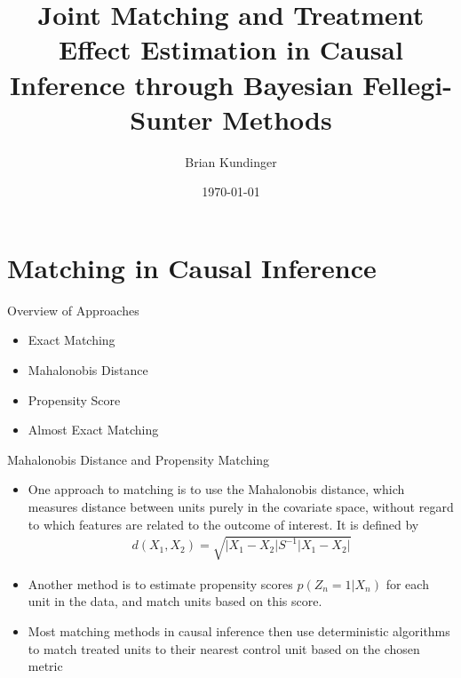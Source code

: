 \documentclass{beamer}
\begin{document}
	\title{Joint Matching and Treatment Effect Estimation in Causal Inference through Bayesian Fellegi-Sunter Methods}
	\author{Brian Kundinger}
	\date{\today}
	

	
	\begin{frame}
		\titlepage
	\end{frame}

\section{Matching in Causal Inference}
\begin{frame}{Overview of Approaches}
	\begin{itemize}
		\item Exact Matching
		\item Mahalonobis Distance
		\item Propensity Score
		\item Almost Exact Matching
	\end{itemize}
\end{frame}

\begin{frame}{Mahalonobis Distance and Propensity Matching}
	\begin{itemize}
	\item One approach to matching is to use the Mahalonobis distance, which measures distance between units purely in the covariate space, without regard to which features are related to the outcome of interest. It is defined by
		\begin{align}
			d(X_1, X_2) = \sqrt{|X_1 - X_2| S^{-1} |X_1 - X_2|}
		\end{align}
	\item Another method is to estimate propensity scores $p(Z_n = 1 |X_n)$ for each unit in the data, and match units based on this score.
	\item Most matching methods in causal inference then use deterministic algorithms to match treated units to their nearest control unit based on the chosen metric
	\end{itemize}
\end{frame}
\end{document}
